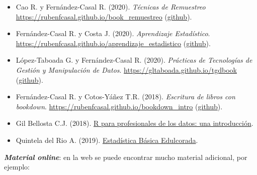 \documentclass[
]{book}
\theoremstyle{break}
\theoremstyle{definition}
\theoremstyle{definition}
\theoremstyle{definition}
\theoremstyle{remark}
\begin{document}
\begin{itemize}
  \begin{itemize}
  \item
    Cao R. y Fernández-Casal R. (2020). \emph{Técnicas de Remuestreo} \url{https://rubenfcasal.github.io/book_remuestreo} (\href{https://github.com/rubenfcasal/book_remuestreo}{github}).
  \item
    Fernández-Casal R. y Costa J. (2020). \emph{Aprendizaje Estadístico}. \url{https://rubenfcasal.github.io/aprendizaje_estadistico} (\href{https://github.com/rubenfcasal/aprendizaje_estadistico}{github}).
  \item
    López-Taboada G. y Fernández-Casal R. (2020). \emph{Prácticas de Tecnologías de Gestión y Manipulación de Datos}. \url{https://gltaboada.github.io/tgdbook} (\href{https://github.com/gltaboada/tgdbook}{github}).
  \item
    Fernández-Casal R. y Cotos-Yáñez T.R. (2018). \emph{Escritura de libros con bookdown}. \url{https://rubenfcasal.github.io/bookdown_intro} (\href{https://github.com/rubenfcasal/bookdown_intro}{github}).
  \item
    Gil Bellosta C.J. (2018). \href{https://www.datanalytics.com/libro_r/index.html}{R para profesionales de los datos: una introducción}.
  \item
    Quintela del Rio A. (2019). \href{https://bookdown.org/aquintela/EBE}{Estadística Básica Edulcorada}.
  \end{itemize}
\end{itemize}

\textbf{\emph{Material online}}:
en la web se puede encontrar mucho material adicional, por ejemplo:
\end{document}
